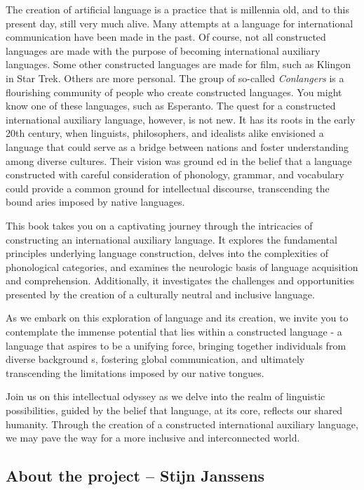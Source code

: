 The creation of artificial language is a practice that is millennia old, and to
this present day, still very much alive. Many attempts at a language for
international communication have been made in the past. Of course, not all
constructed languages are made with the purpose of becoming international
auxiliary languages. Some other constructed languages are made for film, such
as Klingon in Star Trek. Others are more personal. The group of so-called {\it Conlangers} is a flourishing
community of people who create constructed languages. You might know one of
these languages, such as Esperanto. The quest for a constructed international
auxiliary language, however, is not new. It has its roots in the early 20th
century, when linguists, philosophers, and idealists alike envisioned a
language that could serve as a bridge between nations and foster understanding
among diverse cultures. Their vision was ground ed in the belief that a language
constructed with careful consideration of phonology, grammar, and vocabulary
could provide a common ground  for intellectual discourse, transcending the
bound aries imposed by native languages.


This book takes you on a captivating journey through the intricacies of constructing an international auxiliary language. It explores the fundamental principles underlying language construction, delves into the complexities of phonological categories, and examines the neurologic basis of language acquisition and comprehension. Additionally, it investigates the challenges and opportunities presented by the creation of a culturally neutral and inclusive language. 

As we embark on this exploration of language and its creation, we invite you to contemplate the immense potential that lies within a constructed language - a language that aspires to be a unifying force, bringing together individuals from diverse background s, fostering global communication, and ultimately transcending the limitations imposed by our native tongues. 

Join us on this intellectual odyssey as we delve into the realm of linguistic possibilities, guided by the belief that language, at its core, reflects our shared humanity. Through the creation of a constructed international auxiliary language, we may pave the way for a more inclusive and interconnected world. 

\vfill 

\subsection{About the project -- {\small Stijn Janssens}}

